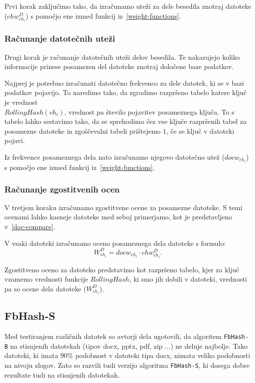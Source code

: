 \documentclass{acm_proc_article-sp}
\begin{document}
Prvi korak zaključimo tako, da izračunamo uteži za dele besedila znotraj datoteke ($chw_{ch_i}^D$) s pomočjo ene izmed funkcij iz~\ref{weight-functions}. 

\subsubsection{Računanje datotečnih uteži}

Drugi korak je računanje datotečnih uteži delov besedila. Te nakazujejo koliko informacije prinese posamezen del datoteke znotraj določene baze podatkov. 

Najprej je potrebno izračunati datotečno frekvenco za dele datotek, ki se v bazi podatkov pojavijo. To naredimo tako, da zgradimo razpršeno tabelo katere ključ je vrednost \\ $RollingHash(ch_i)$, vrednost pa število pojavitev posameznega ključa. To s tabelo lahko sestavimo tako, da se sprehodimo čez vse ključe razpršenih tabel za posamezne datoteke in zgoščevalni tabeli prištejemo $1$, če se ključ v datoteki pojavi.

Iz frekvence posameznega dela nato izračunamo njegovo datotečno utež ($docw_{ch_i}$) s pomočjo ene izmed funkcij iz~\ref{weight-functions}.

\subsubsection{Računanje zgostitvenih ocen}

V tretjem koraku izračunamo zgostitvene ocene za posamezne datoteke. S temi ocenami lahko kasneje datoteke med seboj primerjamo, kot je predstavljeno v~\ref{doc-compare}.

V vsaki datoteki izračunamo oceno posameznega dela datoteke s formulo: \begin{displaymath}  W_{ch_i}^D = docw_{ch_i} \cdot chw_{ch_i}^D. \end{displaymath}

Zgostitveno oceno za datoteko predstavimo kot razpršeno tabelo, kjer za ključ vzamemo vrednosti funkcije $RollingHash$, ki smo jih dobili v datoteki, vrednosti pa so ocene dela datoteke ($W_{ch_i}^D$).

\subsection{FbHash-S}

Med testiranjem različnih datotek so avtorji dela ugotovili, da algoritem \texttt{FbHash-B} na stisnjenih datotekah (tipov docx, pptx, pdf, zip ...) ne deluje najbolje. Tako datoteki, ki imata $90$\% podobnost v datoteki tipa docx, nimata veliko podobnosti na nivoju zlogov. Zato so razvili tudi verzijo algoritma \texttt{FbHash-S}, ki dosega dobre rezultate tudi na stisnjenih datotekah.
\end{document}
